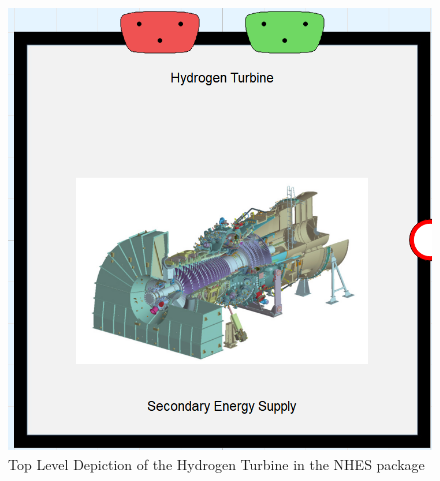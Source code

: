 \begin{figure}[hbtp]
\centering
\includegraphics[scale=0.4]{pics/Hydrogen_Turbine.png}
\caption{Top Level Depiction of the Hydrogen Turbine in the NHES package}
\label{Top View Hydrogen Turbine}
\end{figure}
%
